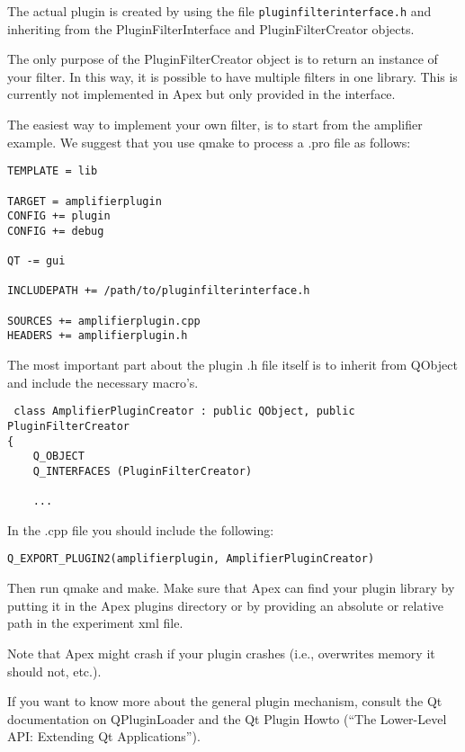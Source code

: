The actual plugin is created by using the file \texttt{pluginfilterinterface.h} and inheriting from the PluginFilterInterface and PluginFilterCreator objects.

The only purpose of the PluginFilterCreator object is to return an instance of your filter. In this way, it is possible to have multiple filters in one library. This is currently not implemented in Apex but only provided in the interface.

The easiest way to implement your own filter, is to start from the amplifier example. We suggest that you use qmake to process a .pro file as follows:

\begin{verbatim}
TEMPLATE = lib

TARGET = amplifierplugin
CONFIG += plugin
CONFIG += debug

QT -= gui

INCLUDEPATH += /path/to/pluginfilterinterface.h

SOURCES += amplifierplugin.cpp
HEADERS += amplifierplugin.h
\end{verbatim}

The most important part about the plugin .h file itself is to inherit from QObject and include the necessary macro's.

\begin{verbatim}
 class AmplifierPluginCreator : public QObject, public PluginFilterCreator
{
    Q_OBJECT
    Q_INTERFACES (PluginFilterCreator)

    ...
\end{verbatim}

In the .cpp file you should include the following:

\begin{verbatim}
Q_EXPORT_PLUGIN2(amplifierplugin, AmplifierPluginCreator)
\end{verbatim}


Then run qmake and make. Make sure that Apex can find your plugin library by putting it in the Apex plugins directory or by providing an absolute or relative path in the experiment xml file.

Note that Apex might crash if your plugin crashes (i.e., overwrites memory it should not, etc.).

If you want to know more about the general plugin mechanism, consult the Qt documentation on QPluginLoader and the Qt Plugin Howto (``The Lower-Level API: Extending Qt Applications'').
